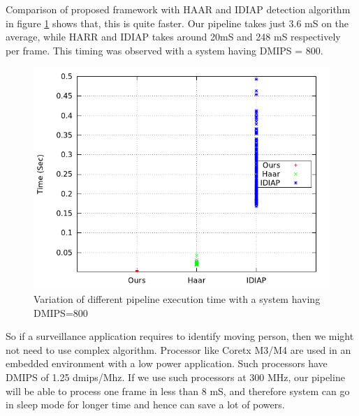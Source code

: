 Comparison of proposed framework with HAAR and IDIAP detection algorithm
in figure \ref{pipeline_execution_time} shows that, this is quite
faster. Our pipeline takes just 3.6 mS on the average, while HARR and
IDIAP takes around 20mS and 248 mS respectively per frame. This timing
was observed with a system having DMIPS = 800.

\begin{figure}[!b]
\centering
\includegraphics[scale=0.60]{Figures/pipeline_execution_time}
\caption{Variation of different pipeline execution time with a system
having DMIPS=800}
\label{pipeline_execution_time}
\end{figure}

So if a surveillance application requires to identify moving person,
then we might not need to use complex algorithm. Processor like Coretx
M3/M4 are used in an embedded environment with a low power application.
Such processors have DMIPS of 1.25 dmips/Mhz. If we use such processors
at 300 MHz, our pipeline will be able to process one frame in less than
8 mS, and therefore system can go in sleep mode for longer time and
hence can save a lot of powers.


